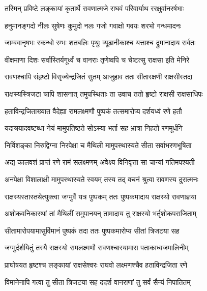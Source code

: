 
\twolineshloka
{तस्मिन् प्रविष्टे लङ्कायां कृतार्थे रावणात्मजे}
{राघवं परिवार्याथ ररक्षुर्वानरर्षभाः} %

\twolineshloka
{हनुमानङ्गदो नीलः सुषेणः कुमुदो नलः}
{गजो गवाक्षो गवयः शरभो गन्धमादनः} %

\twolineshloka
{जाम्बवानृषभः स्कन्धो रम्भः शतबलिः पृथुः}
{व्यूढानीकाश्च यत्ताश्च द्रुमानादाय सर्वतः} %

\twolineshloka
{वीक्षमाणा दिशः सर्वास्तिर्यगूर्ध्वं च वानराः}
{तृणेष्वपि च चेष्टत्सु राक्षसा इति मेनिरे} %

\twolineshloka
{रावणश्चापि संहृष्टो विसृज्येन्द्रजितं सुतम्}
{आजुहाव ततः सीतारक्षणी राक्षसीस्तदा} %

\twolineshloka
{राक्षस्यस्त्रिजटा चापि शासनात् तमुपस्थिताः}
{ता उवाच ततो हृष्टो राक्षसी राक्षसाधिपः} %

\twolineshloka
{हताविन्द्रजिताख्यात वैदेह्या रामलक्ष्मणौ}
{पुष्पकं तत्समारोप्य दर्शयध्वं रणे हतौ} %

\twolineshloka
{यदाश्रयादवष्टब्धा नेयं मामुपतिष्ठते}
{सोऽस्या भर्ता सह भ्रात्रा निहतो रणमूर्धनि} %

\twolineshloka
{निर्विशङ्का निरुद्विग्ना निरपेक्षा च मैथिली}
{मामुपस्थास्यते सीता सर्वाभरणभूषिता} %

\twolineshloka
{अद्य कालवशं प्राप्तं रणे रामं सलक्ष्मणम्}
{अवेक्ष्य विनिवृत्ता सा चान्यां गतिमपश्यती} %

\twolineshloka
{अनपेक्षा विशालाक्षी मामुपस्थास्यते स्वयम्}
{तस्य तद् वचनं श्रुत्वा रावणस्य दुरात्मनः} %

\twolineshloka
{राक्षस्यस्तास्तथेत्युक्त्वा जग्मुर्वै यत्र पुष्पकम्}
{ततः पुष्पकमादाय राक्षस्यो रावणाज्ञया} %

\twolineshloka
{अशोकवनिकास्थां तां मैथिलीं समुपानयन्}
{तामादाय तु राक्षस्यो भर्तृशोकपराजिताम्} %

\twolineshloka
{सीतामारोपयामासुर्विमानं पुष्पकं तदा}
{ततः पुष्पकमारोप्य सीतां त्रिजटया सह} %

\twolineshloka
{जग्मुर्दर्शयितुं तस्यै राक्षस्यो रामलक्ष्मणौ}
{रावणश्चारयामास पताकाध्वजमालिनीम्} %

\twolineshloka
{प्राघोषयत हृष्टश्च लङ्कायां राक्षसेश्वरः}
{राघवो लक्ष्मणश्चैव हताविन्द्रजिता रणे} %

\twolineshloka
{विमानेनापि गत्वा तु सीता त्रिजटया सह}
{ददर्श वानराणां तु सर्वं सैन्यं निपातितम्} %

